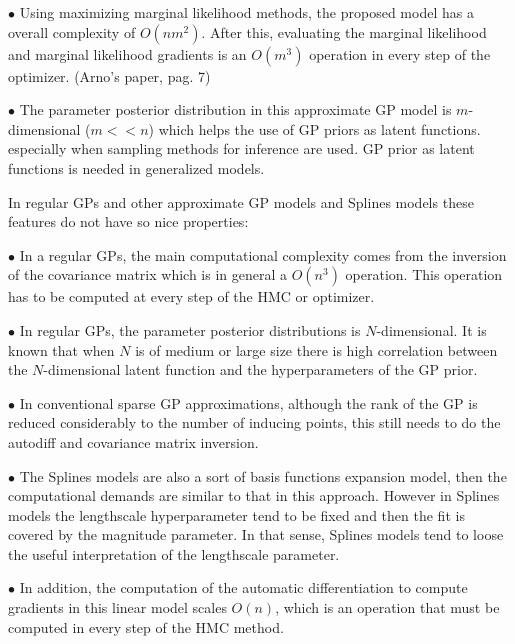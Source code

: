 \documentclass[]{interact}
\theoremstyle{plain}%
\theoremstyle{definition}
\theoremstyle{remark}
\begin{document}
\vspace{2mm}
$\bullet$ Using maximizing marginal likelihood methods, the proposed model has a overall complexity of $O(nm^2)$. After this, evaluating the marginal likelihood and marginal likelihood gradients is an $O(m^3)$ operation in every step of the optimizer. (Arno's paper, pag. 7)

\vspace{2mm}
$\bullet$ The parameter posterior distribution in this approximate GP model is $m$-dimensional ($m<<n$) which helps the use of GP priors as latent functions. especially when sampling methods for inference are used. GP prior as latent functions is needed in generalized models.

In regular GPs and other approximate GP models and Splines models these features do not have so nice properties:

\vspace{2mm}
$\bullet$ In a regular GPs, the main computational complexity comes from the inversion of the covariance matrix which is in general a $O(n^3)$ operation. This operation has to be computed at every step of the HMC or optimizer.

\vspace{2mm}
$\bullet$ In regular GPs, the parameter posterior distributions is $N$-dimensional. It is known that when $N$ is of medium or large size there is high correlation between the $N$-dimensional latent function and the hyperparameters of the GP prior.

\vspace{2mm}
$\bullet$ In conventional sparse GP approximations, although the rank of the GP is reduced considerably to the number of inducing points, this still needs to do the autodiff and covariance matrix inversion.

\vspace{2mm}
$\bullet$ The Splines models are also a sort of basis functions expansion model, then the computational demands are similar to that in this approach. However in Splines models the lengthscale hyperparameter tend to be fixed and then the fit is covered by the magnitude parameter. In that sense, Splines models tend to loose the useful interpretation of the lengthscale parameter.

\vspace{2mm}
$\bullet$ In addition, the computation of the automatic differentiation to compute gradients in this linear model scales $O(n)$, which is an operation that must be computed in every step of the HMC method.
\end{document}
